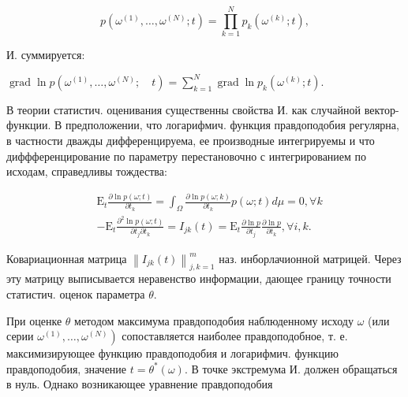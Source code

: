 \documentclass[10pt]{article}
\begin{document}
\[

p\left(\omega^{(1)}, \ldots, \omega^{(N)} ; t\right)=\prod_{k=1}^{N} p_{k}\left(\omega^{(k)} ; t\right),

\]



И. суммируется:



$\operatorname{grad} \ln p\left(\omega^{(1)}, \ldots, \omega^{(N)} ; \quad t\right)=\sum_{k=1}^{N} \operatorname{grad} \ln p_{k}\left(\omega^{(k)} ; t\right)$.



В теории статистич. оценивания существенны свойства И. как случайной вектор-функции. В предположении, что логарифмич. функция правдоподобия регулярна, в частности дважды дифференцируема, ее производные интегрируемы и что диффференцирование по параметру перестановочно с интегрированием по исходам, справедливы тождества:



\[

\begin{aligned}

& \mathrm{E}_{t} \frac{\partial \ln p(\omega ; t)}{\partial t_{k}}=\int_{\Omega} \frac{\partial \ln p(\omega ; k)}{\partial t_{k}} p(\omega ; t) d \mu=0, \forall k \\

& -\mathrm{E}_{t} \frac{\partial^{2} \ln p(\omega ; t)}{\partial t_{j} \partial t_{k}}=I_{j k}(t)=\mathrm{E}_{t} \frac{\partial \ln p}{\partial t_{j}} \frac{\partial \ln p}{\partial t_{k}}, \forall i, k .

\end{aligned}

\]



Ковариационная матрица $\left\|I_{j k}(t)\right\|_{j, k=1}^{m}$ наз. инборлачионной матрицей. Через эту матрицу выписывается неравенство информации, дающее границу точности статистич. оценок параметра $\theta$.



При оценке $\theta$ методом максимума правдоподобия наблюденному исходу $\omega$ (или серии $\left.\omega^{(1)}, \ldots, \omega^{(N)}\right)$ сопоставляется наиболее правдоподобное, т. е. максимизирующее функцию правдоподобия и логарифмич. функцию правдоподобия, значение $t=\theta^{*}(\omega)$. В точке экстремума И. должен обращаться в нуль. Однако возникающее уравнение правдоподобия
\end{document}
